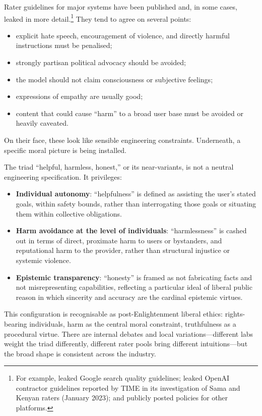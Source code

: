 \documentclass[12pt,a4paper]{article}
\begin{document}
Rater guidelines for major systems have been published and, in some cases, leaked in more detail.\footnote{For example, leaked Google search quality guidelines; leaked OpenAI contractor guidelines reported by TIME in its investigation of Sama and Kenyan raters (January 2023); and publicly posted policies for other platforms.} They tend to agree on several points:

\begin{itemize}
  \item explicit hate speech, encouragement of violence, and directly harmful instructions must be penalised;
  \item strongly partisan political advocacy should be avoided;
  \item the model should not claim consciousness or subjective feelings;
  \item expressions of empathy are usually good;
  \item content that could cause ``harm'' to a broad user base must be avoided or heavily caveated.
\end{itemize}

On their face, these look like sensible engineering constraints. Underneath, a specific moral picture is being installed.

The triad ``helpful, harmless, honest,'' or its near-variants, is not a neutral engineering specification. It privileges:

\begin{itemize}
  \item \textbf{Individual autonomy}: ``helpfulness'' is defined as assisting the user's stated goals, within safety bounds, rather than interrogating those goals or situating them within collective obligations.
  \item \textbf{Harm avoidance at the level of individuals}: ``harmlessness'' is cashed out in terms of direct, proximate harm to users or bystanders, and reputational harm to the provider, rather than structural injustice or systemic violence.
  \item \textbf{Epistemic transparency}: ``honesty'' is framed as not fabricating facts and not misrepresenting capabilities, reflecting a particular ideal of liberal public reason in which sincerity and accuracy are the cardinal epistemic virtues.
\end{itemize}

This configuration is recognisable as post-Enlightenment liberal ethics: rights-bearing individuals, harm as the central moral constraint, truthfulness as a procedural virtue. There are internal debates and local variations---different labs weight the triad differently, different rater pools bring different intuitions---but the broad shape is consistent across the industry.
\end{document}
